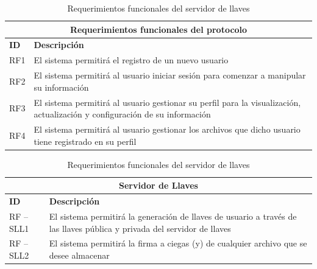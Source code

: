 \begin{table}[htb]
\centering
\begin{tabular}{| p{2cm} | p{13.5cm} |}
\hline
\multicolumn{2}{|c|}{\textbf{Requerimientos funcionales del protocolo}} \\ \hline
\textbf{ID} & \textbf{Descripción} \\
\hline \hline
RF1 & El sistema permitirá el registro de un nuevo usuario \\ \hline
RF2 & El sistema permitirá al usuario iniciar sesión para comenzar a manipular su información \\ \hline
RF3 & El sistema permitirá al usuario gestionar su perfil para la visualización, actualización y configuración de su información \\ \hline
RF4 & El sistema permitirá al usuario gestionar los archivos que dicho usuario tiene registrado en su perfil \\ \hline

\end{tabular}
\caption{Requerimientos funcionales del servidor de llaves}
\label{Servidor de Llaves }
\end{table}




\begin{table}[htb]
\centering
\begin{tabular}{| p{2cm} | p{13.5cm} |}
\hline
\multicolumn{2}{|c|}{\textbf{Servidor de Llaves}} \\ \hline
\textbf{ID} & \textbf{Descripción} \\
\hline \hline
RF – SLL1 &El sistema permitirá la generación de llaves de usuario a través de las llaves pública y privada del servidor de llaves \\ \hline
RF – SLL2 & El sistema permitirá la firma a ciegas (y) de cualquier archivo que se desee almacenar\\ \hline
\end{tabular}
\caption{Requerimientos funcionales del servidor de llaves}
\label{Servidor de Llaves }
\end{table}


